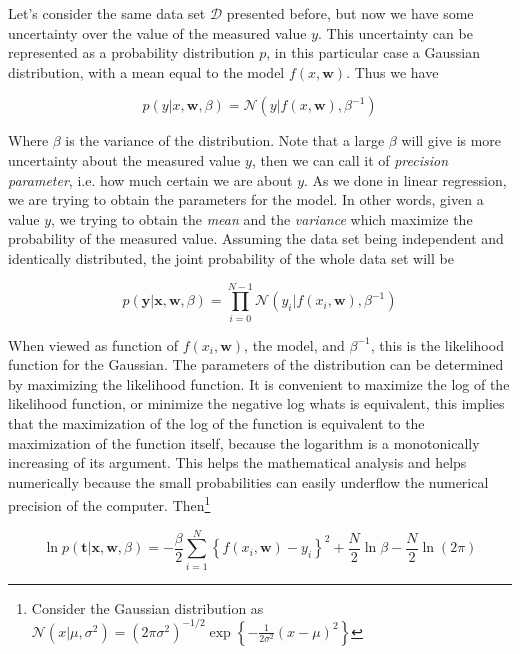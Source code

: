 \documentclass[11pt]{article} %
\begin{document}
Let's consider the same data set $\mathcal{D}$ presented before, but now we have some uncertainty over the value of the measured value $y$. This uncertainty can be represented as a probability distribution $p$, in this particular case a Gaussian distribution, with a mean equal to the model $f(x,\mathbf{w})$. Thus we have

\begin{equation}
   p(y | x, \mathbf{w}, \beta)=\mathcal{N}\left(y | f(x, \mathbf{w}), \beta^{-1}\right)
\end{equation}

Where $\beta$ is the variance of the distribution. Note that a large $\beta$ will give is more uncertainty about the measured value $y$, then we can call it of \textit{precision parameter}, i.e. how much certain we are about $y$. As we done in linear regression, we are trying to obtain the parameters for the model. In other words, given a value $y$, we trying to obtain the \textit{mean} and the \textit{variance} which maximize the probability of the measured value. Assuming the data set being independent and identically distributed, the joint probability of the whole data set will be

\begin{equation}
   p(\mathbf{y} | \mathbf{x}, \mathbf{w}, \beta)= \prod_{i=0}^{N-1} \mathcal{N}\left(y_i | f(x_i, \mathbf{w}), \beta^{-1}\right)
\end{equation}

When viewed as function of $f(x_i, \mathbf{w})$, the model, and $\beta^{-1}$, this is the likelihood function for the Gaussian. The parameters of the distribution can be determined by maximizing the likelihood function. It is convenient to maximize the log of the likelihood function, or minimize the negative log whats is equivalent, this implies that the maximization of the log of the function is equivalent to the maximization of the function itself, because the logarithm is a monotonically increasing of its argument. This helps the mathematical analysis and helps numerically because the small probabilities can easily underflow the numerical precision of the computer. Then\footnote[2]{Consider the Gaussian distribution as $\mathcal{N}\left(x | \mu, \sigma^{2}\right)=\left(2 \pi \sigma^{2}\right)^{-1 / 2} \exp \left\{-\frac{1}{2 \sigma^{2}}(x-\mu)^{2}\right\}$}

\begin{equation}
   \label{eq:bay-reg-ml-function}
   \ln p(\mathbf{t} | \mathbf{x}, \mathbf{w}, \beta)=-\frac{\beta}{2} \sum_{i=1}^{N}\left\{f\left(x_{i}, \mathbf{w}\right)-y_{i}\right\}^{2}+\frac{N}{2} \ln \beta-\frac{N}{2} \ln (2 \pi)
\end{equation}
\end{document}
